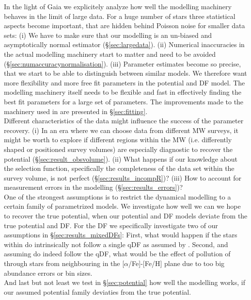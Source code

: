 In the light of Gaia we explicitely analyze how well the modelling machinery behaves in the limit of large data. For a huge number of stars three statistical aspects become important, that are  hidden behind Poisson noise for smaller data sets: (i) We have to make sure that our modelling is an un-biased and asymptotically normal estimator (\S\ref{sec:largedata}). (ii) Numerical inaccuracies in the actual modelling machinery start to matter and need to be avoided (\S\ref{sec:numaccuracynormalisation}). (iii) Parameter estimates become so precise, that we start to be able to distinguish between similar models. We therefore want more flexibility and more free fit parameters in the potential and DF model. The modelling machinery itself needs to be flexible and fast in effectively finding the best fit parameters for a large set of parameters. The improvements made to the machinery used in \cite{bov13} are presented in \S\ref{sec:fitting}. \\

Different characteristics of the data might influence the success of the parameter recovery. (i) In an era where we can choose data from different MW surveys, it might be worth to explore if different regions within the MW (i.e. differently shaped or positioned survey volumes) are especially diagnostic to recover the potential (\S\ref{sec:result_obsvolume}). (ii) What happens if our knowledge about the selection function, specifically the completeness of the data set within the survey volume, is not perfect (\S\ref{sec:results_incompR})? (iii) How to account for measurement errors in the modelling (\S\ref{sec:results_errors})? \\

One of the strongest assumptions is to restrict the dynamical modelling to a certain family of parametrized models. We investigate how well we can we hope to recover the true potential, when our potential and DF models deviate from the true potential and DF. For the DF we specifically investigate two of our assumptions in \S\ref{sec:results_mixedDFs}: First, what would happen if the stars within \MAPs do intrinsically not follow a single qDF as assumed by \cite{tin13,bov13}. Second, and assuming \MAPs do indeed follow the qDF, what would be the effect of pollution of \MAPs through stars from neighbouring \MAPs in the [$\alpha$/Fe]-[Fe/H] plane due to too big abundance errors or bin sizes.\\
And last but not least we test in \S\ref{sec:potential} how well the modelling works, if our assumed potential family deviaties from the true potential. \\

